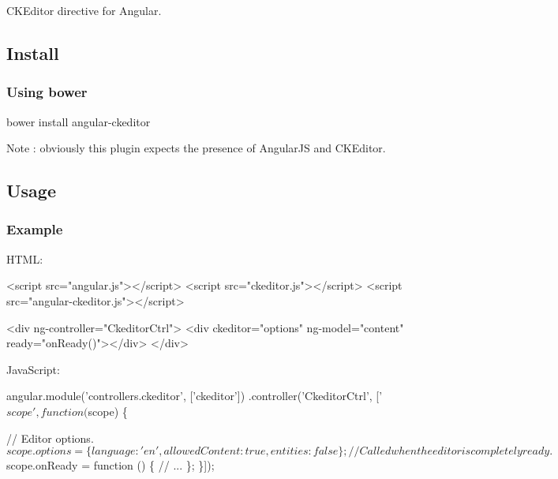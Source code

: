 \href{https://travis-ci.org/lemonde/angular-ckeditor}{\tt } \href{https://david-dm.org/lemonde/angular-ckeditor}{\tt } \href{https://david-dm.org/lemonde/angular-ckeditor#info=devDependencies}{\tt }

C\+K\+Editor directive for Angular.

\subsection*{Install}

\subsubsection*{Using bower}


\begin{DoxyCode}
bower install angular-ckeditor
\end{DoxyCode}


Note \+: obviously this plugin expects the presence of Angular\+JS and C\+K\+Editor.

\subsection*{Usage}

\subsubsection*{Example}

H\+T\+ML\+:


\begin{DoxyCode}
<script src="angular.js"></script>
<script src="ckeditor.js"></script>
<script src="angular-ckeditor.js"></script>

<div ng-controller="CkeditorCtrl">
  <div ckeditor="options" ng-model="content" ready="onReady()"></div>
</div>
\end{DoxyCode}


Java\+Script\+:


\begin{DoxyCode}
angular.module('controllers.ckeditor', ['ckeditor'])
.controller('CkeditorCtrl', ['$scope', function ($scope) \{

  // Editor options.
  $scope.options = \{
    language: 'en',
    allowedContent: true,
    entities: false
  \};

  // Called when the editor is completely ready.
  $scope.onReady = function () \{
    // ...
  \};
\}]);
\end{DoxyCode}


